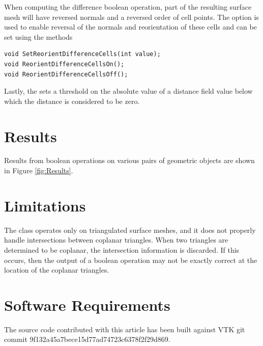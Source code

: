 \documentclass{InsightArticle}
\begin{document}
When computing the difference boolean operation, part of the resulting surface mesh will have reversed normals and a reversed order of cell points. The  option is used to enable reversal of the normals and reorientation of these cells and can be set using the methods
\begin{verbatim}
void SetReorientDifferenceCells(int value);
void ReorientDifferenceCellsOn();
void ReorientDifferenceCellsOff();
\end{verbatim} 

Lastly, the  sets a threshold on the absolute value of a distance field value below which the distance is considered to be zero.
\section{Results}

Results from boolean operations on various pairs of geometric objects are shown in Figure \ref{fig:Results}.

%

\section{Limitations}

The  class operates only on triangulated surface meshes, and it does not properly handle intersections between coplanar triangles. When two triangles are determined to be coplanar, the intersection information is discarded. If this occurs, then the output of a boolean operation may not be exactly correct at the location of the coplanar triangles.

\section{Software Requirements}

The source code contributed with this article has been built against VTK git commit 9f132a45a7bece15d77ad74723c6378f2f29d869.

%
%




%
%



\end{document}
